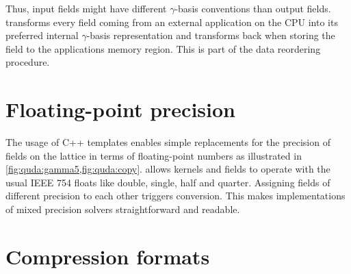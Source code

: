 Thus, input fields might have different $\gamma$-basis conventions than output fields.
\Quda transforms every field coming from an external application on the CPU into its preferred internal $\gamma$-basis representation and transforms back when storing the field to the applications memory region.
This is part of the data reordering procedure.

\section{Floating-point precision}
\label{sec:quda:precision}

The usage of C++ templates enables simple replacements for the precision of fields on the lattice in terms of floating-point numbers as illustrated in \cref{fig:quda:gamma5,fig:quda:copy}. \Quda allows kernels and fields to operate with the usual IEEE 754 floats like double, single, half and quarter. Assigning fields of different precision to each other triggers conversion. This makes implementations of mixed precision solvers straightforward and readable.

\section{Compression formats}
\label{quda:compresed:formats}

